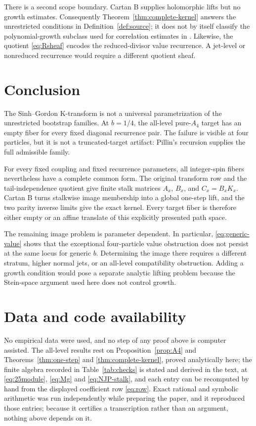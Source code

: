 \documentclass[11pt,reqno]{amsart}
\theoremstyle{definition}
\theoremstyle{remark}
\begin{document}
There is a second scope boundary.  Cartan B supplies holomorphic lifts but no
growth estimates.  Consequently Theorem~\ref{thm:complete-kernel} answers the
unrestricted conditions in Definition~\ref{def:source}; it does not by itself
classify the polynomial-growth subclass used for correlation estimates in
\cite{Kozlowski_2025om}.  Likewise, the quotient \eqref{eq:Rsheaf} encodes the
reduced-divisor value recurrence.  A jet-level or nonreduced recurrence would
require a different quotient sheaf.

\section{Conclusion}
\label{sec:conclusion}

The Sinh--Gordon K-transform is not a universal parametrization of the
unrestricted bootstrap families.  At $b=1/4$, the all-level pure-$A_4$
target has an empty fiber for every fixed diagonal recurrence pair.  The
failure is visible at four particles, but it is not a truncated-target
artifact: Pillin's recursion supplies the full admissible family.

For every fixed coupling and fixed recurrence parameters, all integer-spin
fibers nevertheless have a complete common form.  The original transform row
and the tail-independence quotient give finite stalk matrices
$A_x$, $B_x$, and $C_x=B_xK_x$.  Cartan B turns stalkwise image membership
into a global one-step lift, and the two parity inverse limits give the exact
kernel.  Every target fiber is therefore either empty or an affine translate
of this explicitly presented path space.

The remaining image problem is parameter dependent.  In particular,
\eqref{eq:generic-value} shows that the exceptional four-particle value
obstruction does not persist at the same locus for generic $b$.  Determining
the image there requires a different stratum, higher normal jets, or an
all-level compatibility obstruction.  Adding a growth condition would pose a
separate analytic lifting problem because the Stein-space argument used here
does not control growth.

\section*{Data and code availability}

No empirical data were used, and no step of any proof above is computer
assisted.  The all-level results rest on
Proposition~\ref{prop:A4} and Theorems~\ref{thm:one-step} and
\ref{thm:complete-kernel}, proved analytically here; the finite algebra
recorded in Table~\ref{tab:checks} is stated and derived in the text, at
\eqref{eq:25module}, \eqref{eq:Mg} and \eqref{eq:NJP-stalk}, and each entry
can be recomputed by hand from the displayed coefficient row \eqref{eq:row}.
Exact rational and symbolic arithmetic was run independently while preparing
the paper, and it reproduced those entries; because it certifies a
transcription rather than an argument, nothing above depends on it.



\end{document}
